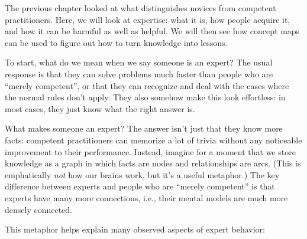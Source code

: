 \documentclass[10pt,statementpaper]{memoir}
\begin{document}
The previous chapter looked at what distinguishes novices from competent
practitioners. Here, we will look at expertise: what it is, how people
acquire it, and how it can be harmful as well as helpful. We will then
see how concept maps can be used to figure out how to turn knowledge
into lessons.

To start, what do we mean when we say someone is an expert? The usual
response is that they can solve problems much faster than people who are
``merely competent'', or that they can recognize and deal with the cases
where the normal rules don't apply. They also somehow make this look
effortless: in most cases, they just know what the right answer is.

What makes someone an expert? The answer isn't just that they know more
facts: competent practitioners can memorize a lot of trivia without any
noticeable improvement to their performance. Instead, imagine for a
moment that we store knowledge as a graph in which facts are nodes and
relationships are arcs. (This is emphatically \emph{not} how our brains
work, but it's a useful metaphor.) The key difference between experts
and people who are ``merely competent'' is that experts have many more
connections, i.e., their mental models are much more densely connected.

\newpage

This metaphor helps explain many observed aspects of expert behavior:
\end{document}
